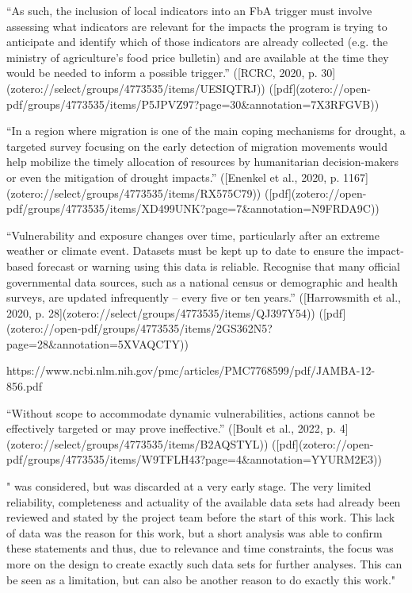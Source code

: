 “As such, the inclusion of local indicators into an FbA trigger must involve assessing what indicators are relevant for the impacts the program is trying to anticipate and identify which of those indicators are already collected (e.g. the ministry of agriculture's food price bulletin) and are available at the time they would be needed to inform a possible trigger.” ([RCRC, 2020, p. 30](zotero://select/groups/4773535/items/UESIQTRJ)) ([pdf](zotero://open-pdf/groups/4773535/items/P5JPVZ97?page=30&annotation=7X3RFGVB))


“In a region where migration is one of the main coping mechanisms for drought, a targeted survey focusing on the early detection of migration movements would help mobilize the timely allocation of resources by humanitarian decision-makers or even the mitigation of drought impacts.” ([Enenkel et al., 2020, p. 1167](zotero://select/groups/4773535/items/RX575C79)) ([pdf](zotero://open-pdf/groups/4773535/items/XD499UNK?page=7&annotation=N9FRDA9C))



“Vulnerability and exposure changes over time, particularly after an extreme weather or climate event. Datasets must be kept up to date to ensure the impact-based forecast or warning using this data is reliable. Recognise that many official governmental data sources, such as a national census or demographic and health surveys, are updated infrequently – every five or ten years.” ([Harrowsmith et al., 2020, p. 28](zotero://select/groups/4773535/items/QJ397Y54)) ([pdf](zotero://open-pdf/groups/4773535/items/2GS362N5?page=28&annotation=5XVAQCTY))





https://www.ncbi.nlm.nih.gov/pmc/articles/PMC7768599/pdf/JAMBA-12-856.pdf

“Without scope to accommodate dynamic vulnerabilities, actions cannot be effectively targeted or may prove ineffective.” ([Boult et al., 2022, p. 4](zotero://select/groups/4773535/items/B2AQSTYL)) ([pdf](zotero://open-pdf/groups/4773535/items/W9TFLH43?page=4&annotation=YYURM2E3))

"
was considered, but was discarded at a very early stage. The very limited reliability, completeness and actuality of the available data sets had already been reviewed and stated by the project team before the start of this work. This lack of data was the reason for this work, but a short analysis was able to confirm these statements and thus, due to relevance and time constraints, 
the focus was more on the design to create exactly such data sets for further analyses. This can be seen as a limitation, but can also be another reason to do exactly this work."

